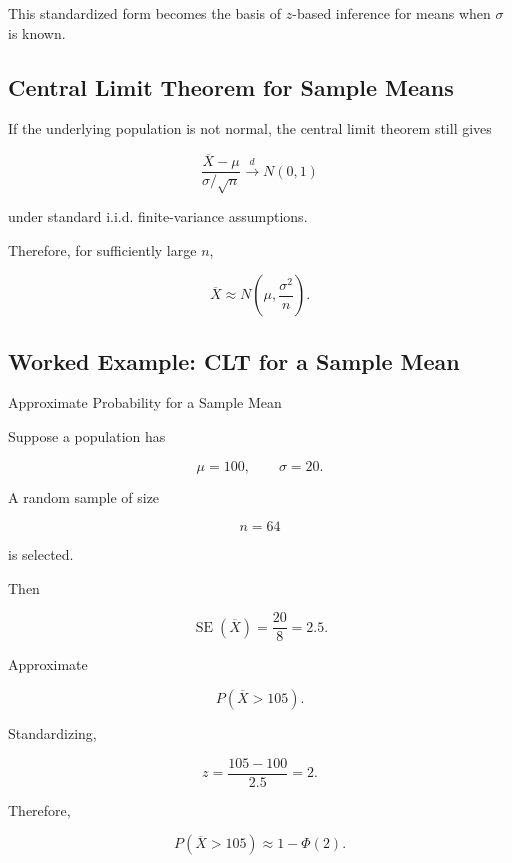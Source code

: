 This standardized form becomes the basis of \(z\)-based inference for
means when \(\sigma\) is known.

\subsection{Central Limit Theorem for Sample Means}
\label{subsec:clt-sampling-distribution-mean}

If the underlying population is not normal, the central limit theorem
still gives

\[
\boxed{
\frac{
\overline{X}-\mu
}{
\sigma/\sqrt{n}
}
\xrightarrow{d}
N(0,1)
}
\]

under standard i.i.d. finite-variance assumptions.

Therefore, for sufficiently large \(n\),

\[
\boxed{
\overline{X}
\approx
N
\left(
\mu,
\frac{\sigma^2}{n}
\right).
}
\]

\subsection{Worked Example: CLT for a Sample Mean}
\label{subsec:worked-clt-sampling-mean}

\begin{workedexamplebox}{Approximate Probability for a Sample Mean}

Suppose a population has

\[
\mu=100,
\qquad
\sigma=20.
\]

A random sample of size

\[
n=64
\]

is selected.

Then

\[
\operatorname{SE}(\overline{X})
=
\frac{20}{8}
=
2.5.
\]

Approximate

\[
P(\overline{X}>105).
\]

Standardizing,

\[
z
=
\frac{
105-100
}{
2.5
}
=
2.
\]

Therefore,

\begin{answerbox}
\[
\boxed{
P(\overline{X}>105)
\approx
1-\Phi(2).
}
\]
\end{answerbox}

\end{workedexamplebox}

